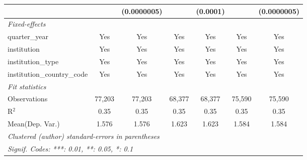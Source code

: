 \begin{tabular}{lcccccc}
                                      &               & (0.0000005)   &               & (0.0001)      &               & (0.0000005)\\   
   \midrule
   \emph{Fixed-effects}\\
   quarter\_year                      & Yes           & Yes           & Yes           & Yes           & Yes           & Yes\\  
   institution                        & Yes           & Yes           & Yes           & Yes           & Yes           & Yes\\  
   institution\_type                  & Yes           & Yes           & Yes           & Yes           & Yes           & Yes\\  
   institution\_country\_code         & Yes           & Yes           & Yes           & Yes           & Yes           & Yes\\  
   \midrule
   \emph{Fit statistics}\\
   Observations                       & 77,203        & 77,203        & 68,377        & 68,377        & 75,590        & 75,590\\  
   R$^2$                              & 0.35          & 0.35          & 0.35          & 0.35          & 0.35          & 0.35\\  
Mean(Dep. Var.) & 1.576 & 1.576 & 1.623 & 1.623 & 1.584 & 1.584 \\
   \midrule \midrule
   \multicolumn{7}{l}{\emph{Clustered (author) standard-errors in parentheses}}\\
   \multicolumn{7}{l}{\emph{Signif. Codes: ***: 0.01, **: 0.05, *: 0.1}}\\
\end{tabular}
\par\endgroup
